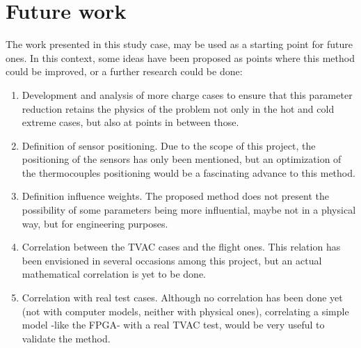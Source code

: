 \section{Future work}

The work presented in this study case, may be used as a starting point for future ones. In this context, some ideas have been proposed as points where this method could be improved, or a further research could be done:
\begin{enumerate}
    \item Development and analysis of more charge cases to ensure that this parameter reduction retains the physics of the problem not only in the  hot and cold extreme cases, but also at points in between those.
    \item Definition of sensor positioning. Due to the scope of this project, the positioning of the sensors has only been mentioned, but an optimization of the thermocouples positioning would be a fascinating advance to this method.
    \item Definition influence weights. The proposed method does not present the possibility of some parameters being more influential, maybe not in a physical way, but for engineering purposes. 
    \item Correlation between the TVAC cases and the flight ones. This relation has been envisioned in several occasions among this project, but an actual mathematical correlation is yet to be done.
    \item Correlation with real test cases. Although no correlation has been done yet (not with computer models, neither with physical ones), correlating a simple model -like the FPGA- with a real TVAC test, would be very useful to validate the method.
\end{enumerate}
